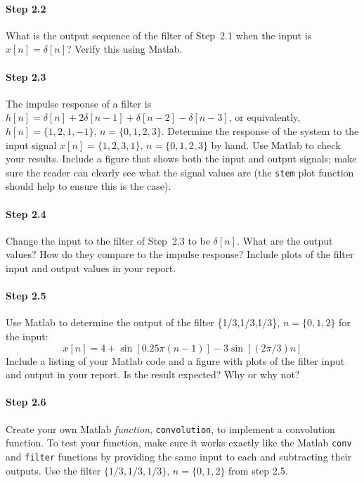 \paragraph{Step 2.2} What is the output sequence of the filter of
	Step~2.1 when the input is $x[n] = \delta[n]$? Verify this
        using Matlab.


\paragraph{Step 2.3} The impulse response of a filter is $h[n]
        = \delta[n] + 2\delta[n-1] + \delta[n-2] - \delta[n-3]$, or equivalently,
        $h[n]=\{1,2,1,-1\}$, $n=\{0, 1, 2, 3\}$. Determine the
        response of the system to the input signal $x[n]=\{1,2,3,1\}$,
        $n=\{0, 1,2,3\}$ by hand. Use Matlab to check your
        results. Include a figure that shows both the input and output
        signals; make sure the reader can clearly see what the signal
        values are (the \verb|stem| plot function should help to
        ensure this is the case).

\paragraph{Step 2.4} Change the input to the filter of
        Step~2.3 to be $\delta[n]$. What are the output values? How do
        they compare to the impulse response? Include plots of the
        filter input and output values in your report.


\paragraph{Step 2.5} Use Matlab to determine the output of the
        filter \{1/3,1/3,1/3\}, $n=\{0,1,2\}$ for the input:
	\begin{equation}
	  x[n] = 4 + \sin[0.25\pi(n-1)] - 3 \sin[(2\pi/3)n]  
	\end{equation}
        Include a listing of your Matlab code and a figure with
        plots of the filter input and output in your report. Is the
        result expected? Why or why not?
	
	

\paragraph{Step 2.6} Create your own Matlab \emph{function},
        \verb|convolution|, to implement a convolution function.  To
        test your function, make sure it works exactly like the Matlab
        \verb|conv| and \verb|filter| functions by providing the same
        input to each and subtracting their outputs. Use the filter
        $\{1/3,1/3,1/3\}$, $n=\{0,1,2\}$ from step 2.5.
	

